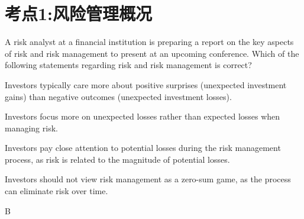 \documentclass{article}
\newcounter{question} %
\begin{document}
 \tableofcontents %
\newpage


\section{考点1:风险管理概况}
\setcounter{question}{0}


\begin{question}
    A risk analyst at a financial institution is preparing a report on the key aspects of risk and risk management to present at an upcoming conference. Which of the following statements regarding risk and risk management is correct?
\end{question}

\begin{choices}

        \item Investors typically care more about positive surprises (unexpected investment gains) than negative outcomes (unexpected investment losses).
        
        \item Investors focus more on unexpected losses rather than expected losses when managing risk.
        
        \item Investors pay close attention to potential losses during the risk management process, as risk is related to the magnitude of potential losses.
        
        \item Investors should not view risk management as a zero-sum game, as the process can eliminate risk over time.

\end{choices}


\begin{correctanswer}
    B
\end{correctanswer}
\end{document}
